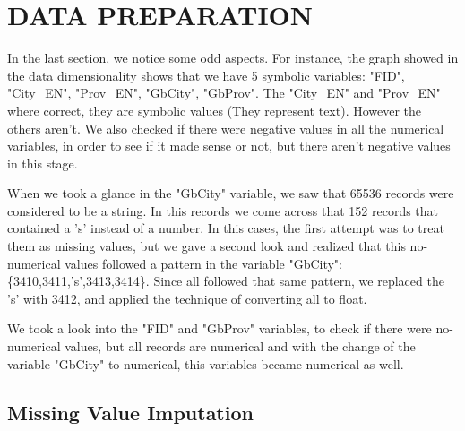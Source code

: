 \documentclass[11pt]{article}
\begin{document}


\section{DATA PREPARATION}

In the last section, we notice some odd aspects. For instance, the graph showed in the data dimensionality shows that we have 5 symbolic variables: "FID", "City\_EN", "Prov\_EN", "GbCity", "GbProv". The "City\_EN" and "Prov\_EN" where correct, they are symbolic values (They represent text). However the others aren't.
We also checked if there were negative values in all the numerical variables, in order to see if it made sense or not, but there aren't negative values in this stage.

When we took a glance in the "GbCity" variable, we saw that 65536 records were considered to be a string. In this records we come across that 152 records that contained a 's' instead of a number. In this cases, the first attempt was to treat them as missing values, but we gave a second look and realized that this no-numerical values followed a pattern in the variable "GbCity": \{3410,3411,'s',3413,3414\}. Since all followed that same pattern, we replaced the 's' with 3412, and applied the technique of converting all to float.

We took a look into the "FID" and "GbProv" variables, to check if there were no-numerical values, but all records are numerical and with the change of the variable "GbCity" to numerical, this variables became numerical as well.

\subsection*{Missing Value Imputation}
\end{document}
